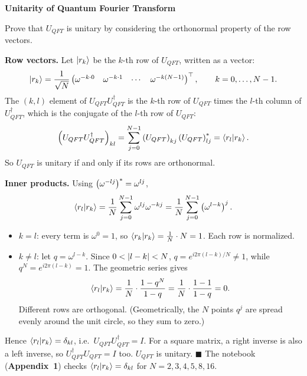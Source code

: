\documentclass[a4paper, 10pt]{article}
\begin{document}
\begin{problem}
\textbf{Unitarity of Quantum Fourier Transform}
\par Prove that \( U_{QFT} \) is unitary by considering the orthonormal property of the row vectors.
\end{problem}

\begin{solution}
	\noindent \textbf{Row vectors.} Let \( \ket{r_k} \) be the \( k \)-th row of \( U_{QFT} \), written as a vector:
	\[
		\ket{r_k} = \frac{1}{\sqrt{N}}\begin{pmatrix} \omega^{-k \cdot 0} & \omega^{-k \cdot 1} & \cdots & \omega^{-k(N - 1)} \end{pmatrix}^{\top}, \qquad k = 0, \dots, N - 1.
	\]
	The \( (k, l) \) element of \( U_{QFT}U_{QFT}^{\dagger} \) is the \( k \)-th row of \( U_{QFT} \) times the \( l \)-th column of \( U_{QFT}^{\dagger} \), which is the conjugate of the \( l \)-th row of \( U_{QFT} \):
	\[
		\left(U_{QFT}U_{QFT}^{\dagger}\right)_{kl} = \sum_{j = 0}^{N - 1}\left(U_{QFT}\right)_{kj}\left(U_{QFT}\right)_{lj}^{*} = \braket{r_l \vert r_k}.
	\]
	So \( U_{QFT} \) is unitary if and only if its rows are orthonormal.

	\myspace

	\noindent \textbf{Inner products.} Using \( \left(\omega^{-lj}\right)^{*} = \omega^{lj} \),
	\[
		\braket{r_l \vert r_k} = \frac{1}{N}\sum_{j = 0}^{N - 1}\omega^{lj}\omega^{-kj} = \frac{1}{N}\sum_{j = 0}^{N - 1}\left(\omega^{l - k}\right)^{j}.
	\]
	\begin{itemize}
		\item \( k = l \): every term is \( \omega^0 = 1 \), so \( \braket{r_k \vert r_k} = \tfrac{1}{N} \cdot N = 1 \). Each row is normalized.
		\item \( k \neq l \): let \( q = \omega^{l - k} \). Since \( 0 < \left|l - k\right| < N \), \( q = e^{i2\pi(l - k)/N} \neq 1 \), while \( q^N = e^{i2\pi(l - k)} = 1 \). The geometric series gives
		      \[
			      \braket{r_l \vert r_k} = \frac{1}{N}\cdot\frac{1 - q^N}{1 - q} = \frac{1}{N}\cdot\frac{1 - 1}{1 - q} = 0 .
		      \]
		      Different rows are orthogonal. (Geometrically, the \( N \) points \( q^j \) are spread evenly around the unit circle, so they sum to zero.)
	\end{itemize}
	Hence \( \braket{r_l \vert r_k} = \delta_{kl} \), i.e.\ \( U_{QFT}U_{QFT}^{\dagger} = I \). For a square matrix, a right inverse is also a left inverse, so \( U_{QFT}^{\dagger}U_{QFT} = I \) too. \( U_{QFT} \) is unitary. \( \blacksquare \)
	The notebook (\textbf{Appendix~1}) checks \( \braket{r_l \vert r_k} = \delta_{kl} \) for \( N = 2, 3, 4, 5, 8, 16 \).
\end{solution}
\end{document}
